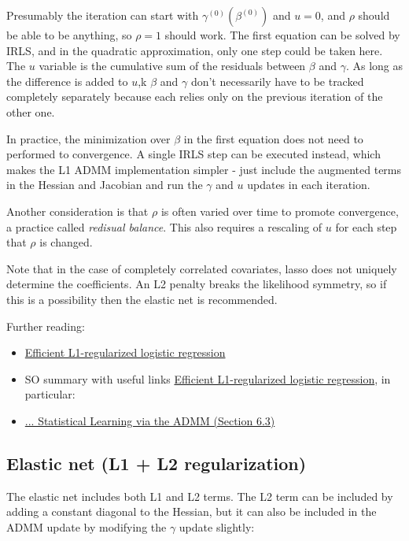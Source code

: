 \documentclass{article}
\begin{document}
Presumably the iteration can start with \(\gamma^{(0)}(\beta^{(0)})\) and \(u = 0\), and
\(\rho\) should be able to be anything, so \(\rho=1\) should work. The
first equation can be solved by IRLS, and in the quadratic approximation, only
one step could be taken here. The \(u\) variable is the cumulative sum of the
residuals between \(\beta\) and \(\gamma\). As long as the difference is
added to \(u\),k \(\beta\) and \(\gamma\) don't necessarily have to be
tracked completely separately because each relies only on the previous
iteration of the other one.

In practice, the minimization over \(\beta\) in the first equation does not
need to performed to convergence. A single IRLS step can be executed instead,
which makes the L1 ADMM implementation simpler - just include the augmented
terms in the Hessian and Jacobian and run the \(\gamma\) and \(u\) updates
in each iteration.

Another consideration is that \(\rho\) is often varied over time to promote
convergence, a practice called \emph{redisual balance}. This also requires a
rescaling of \(u\) for each step that \(\rho\) is changed.

Note that in the case of completely correlated covariates, lasso does not
uniquely determine the coefficients. An L2 penalty breaks the likelihood
symmetry, so if this is a possibility then the elastic net is recommended.

Further reading:
\begin{itemize}
\item \href{https://www.andrewng.org/publications/efficient-l1-regularized-logistic-regression/}{Efficient L1-regularized logistic regression}
\item SO summary with useful links \href{https://math.stackexchange.com/a/3608432}{Efficient L1-regularized logistic regression}, in particular:
\item \href{https://web.stanford.edu/~boyd/papers/pdf/admm_distr_stats.pdf}{... Statistical Learning via the ADMM (Section 6.3)}
\end{itemize}

\subsection{Elastic net (L1 + L2 regularization)}

The elastic net includes both L1 and L2 terms. The L2 term can be included by
adding a constant diagonal to the Hessian, but it can also be included in the
ADMM update by modifying the \(\gamma\) update slightly:
\end{document}
